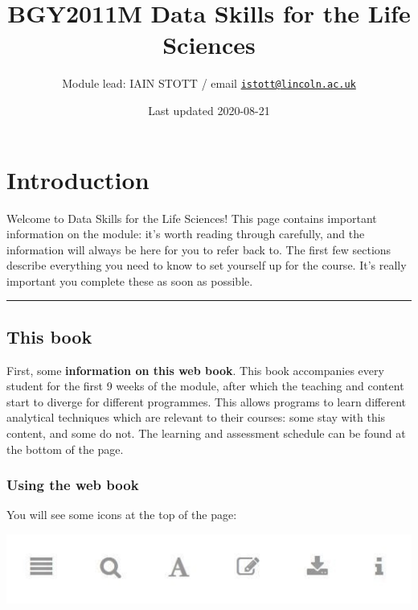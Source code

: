 \documentclass[
]{book}
\title{BGY2011M Data Skills for the Life Sciences}
\author{Module lead: IAIN STOTT / email \href{mailto:istott@lincoln.ac.uk}{\nolinkurl{istott@lincoln.ac.uk}}}
\date{Last updated 2020-08-21}
\begin{document}
\maketitle

{
\setcounter{tocdepth}{1}
\tableofcontents
}
\hypertarget{introduction}{%
\chapter{Introduction}\label{introduction}}

Welcome to Data Skills for the Life Sciences! This page contains important
information on the module: it's worth reading through carefully, and the
information will always be here for you to refer back to. The first few sections
describe everything you need to know to set yourself up for the course. It's
really important you complete these as soon as possible.\\
\hspace*{0.333em}

\begin{center}\rule{0.5\linewidth}{0.5pt}\end{center}

\hypertarget{this-book}{%
\section{This book}\label{this-book}}

First, some \textbf{information on this web book}. This book accompanies every student for
the first 9 weeks of the module, after which the teaching and content start
to diverge for different programmes. This allows programs to learn different
analytical techniques which are relevant to their courses: some stay with this
content, and some do not. The learning and assessment schedule can be found at
the bottom of the page.

\hypertarget{using-the-web-book}{%
\subsection{Using the web book}\label{using-the-web-book}}

You will see some icons at the top of the page:

\includegraphics{gitbook_icons.jpg}
\end{document}

